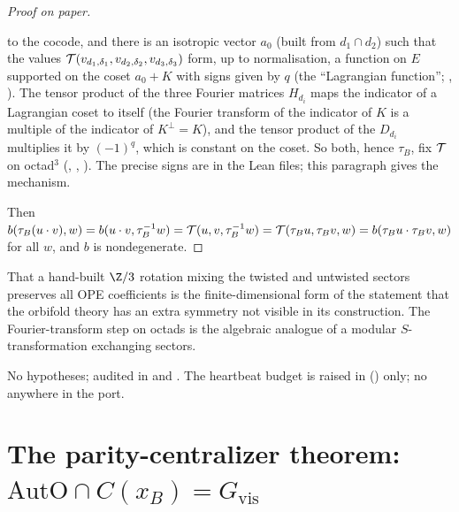\begin{proof}[Proof on paper]
\begin{enumerate}[label=(\roman*)]
  to the cocode, and there is an isotropic vector $a_0$ (built from $d_1\cap d_2$) such that the values
  $\mathcal{T}(v_{d_1,\delta_1},v_{d_2,\delta_2},v_{d_3,\delta_3})$ form, up to normalisation, a function on $E$
  supported on the coset $a_0+K$ with signs given by $q$ (the ``Lagrangian function'';
  , ).  The tensor product of
  the three Fourier matrices $H_{d_i}$ maps the indicator of a Lagrangian coset to itself (the Fourier
  transform of the indicator of $K$ is a multiple of the indicator of $K^\perp=K$), and the tensor product
  of the $D_{d_i}$ multiplies it by $(-1)^q$, which is constant on the coset.  So both, hence $\tau_B$,
  fix $\mathcal{T}$ on octad${}^3$ (, ,
  ).  The precise signs are in the Lean files; this paragraph gives
  the mechanism.
\end{enumerate}
Then $b(\tau_B(u\cdot v),w)=b(u\cdot v,\tau_B^{-1}w)=\mathcal{T}(u,v,\tau_B^{-1}w)=\mathcal{T}(\tau_Bu,\tau_Bv,w)=b(\tau_Bu\cdot\tau_Bv,w)$
for all $w$, and $b$ is nondegenerate.
\end{proof}
\begin{physics}
That a hand-built $\Z/3$ rotation mixing the twisted and untwisted sectors preserves all OPE
coefficients is the finite-dimensional form of the statement that the orbifold theory has an extra
symmetry not visible in its construction.  The Fourier-transform step on octads is the algebraic
analogue of a modular $S$-transformation exchanging sectors.
\end{physics}
\begin{status}
No hypotheses; audited in  and
.  The heartbeat budget is raised in
 () only; no  anywhere in
the port.
\end{status}

\section{The parity-centralizer theorem: \texorpdfstring{$\mathrm{AutO}\cap C(x_B)=G_{\mathrm{vis}}$}{AutO meet C(xB) = Gvis}}\label{ch21:sec:parity}

